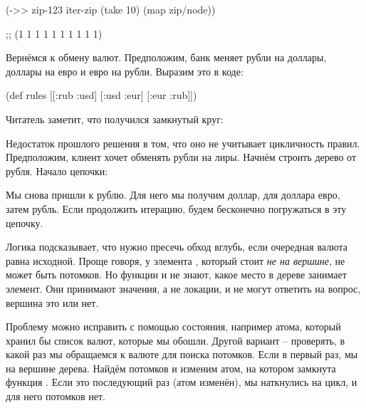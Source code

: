 \begin{english}
  \begin{clojure}
(->> zip-123
     iter-zip
     (take 10)
     (map zip/node))

;; (1 1 1 1 1 1 1 1 1 1)
  \end{clojure}
\end{english}

Вернёмся к обмену валют. Предположим, банк меняет рубли на доллары, доллары на
евро и евро на рубли. Выразим это в коде:

\begin{english}
  \begin{clojure}
(def rules
  [[:rub :usd]
   [:usd :eur]
   [:eur :rub]])
  \end{clojure}
\end{english}

Читатель заметит, что получился замкнутый круг:

\begin{figure}[H]
  \centering
  
  \label{fig:chart-zip-18}
\end{figure}

Недостаток прошлого решения в том, что оно не учитывает цикличность
правил. Предположим, клиент хочет обменять рубли на лиры. Начнём строить дерево
от рубля. Начало цепочки:

\begin{figure}[H]
  \centering
  
  \label{fig:chart-zip-19}
\end{figure}

Мы снова пришли к рублю. Для него мы получим доллар, для доллара евро, затем
рубль. Если продолжить итерацию, будем бесконечно погружаться в эту цепочку.

Логика подсказывает, что нужно пресечь обход вглубь, если очередная валюта равна
исходной. Проще говоря, у элемента , который стоит \emph{не на вершине}, не
может быть потомков. Но функции  и  не знают, какое
место в дереве занимает элемент. Они принимают значения, а не локации, и не
могут ответить на вопрос, вершина это или нет.

Проблему можно исправить с помощью состояния, например атома, который хранил бы
список валют, которые мы обошли. Другой вариант – проверять, в какой раз мы
обращаемся к валюте  для поиска потомков. Если в первый раз, мы на вершине
дерева. Найдём потомков и изменим атом, на котором замкнута функция
. Если это последующий раз (атом изменён), мы наткнулись на цикл, и
для него потомков нет.

